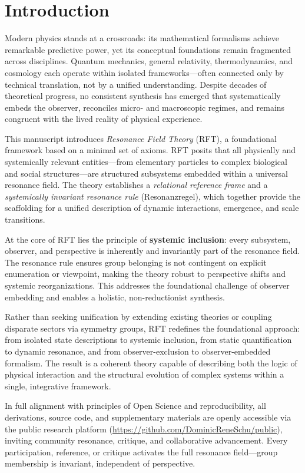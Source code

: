 \documentclass[12pt]{article}
\begin{document}
	\section{Introduction}
	
	Modern physics stands at a crossroads: its mathematical formalisms achieve remarkable predictive power, yet its conceptual foundations remain fragmented across disciplines. Quantum mechanics, general relativity, thermodynamics, and cosmology each operate within isolated frameworks—often connected only by technical translation, not by a unified understanding. Despite decades of theoretical progress, no consistent synthesis has emerged that systematically embeds the observer, reconciles micro- and macroscopic regimes, and remains congruent with the lived reality of physical experience.
	
	This manuscript introduces \textit{Resonance Field Theory} (RFT), a foundational framework based on a minimal set of axioms. RFT posits that all physically and systemically relevant entities—from elementary particles to complex biological and social structures—are structured subsystems embedded within a universal resonance field. The theory establishes a \textit{relational reference frame} and a \textit{systemically invariant resonance rule} (Resonanzregel), which together provide the scaffolding for a unified description of dynamic interactions, emergence, and scale transitions.
	
	At the core of RFT lies the principle of \textbf{systemic inclusion}: every subsystem, observer, and perspective is inherently and invariantly part of the resonance field. The resonance rule ensures group belonging is not contingent on explicit enumeration or viewpoint, making the theory robust to perspective shifts and systemic reorganizations. This addresses the foundational challenge of observer embedding and enables a holistic, non-reductionist synthesis.
	
	Rather than seeking unification by extending existing theories or coupling disparate sectors via symmetry groups, RFT redefines the foundational approach: from isolated state descriptions to systemic inclusion, from static quantification to dynamic resonance, and from observer-exclusion to observer-embedded formalism. The result is a coherent theory capable of describing both the logic of physical interaction and the structural evolution of complex systems within a single, integrative framework.
	
	In full alignment with principles of Open Science and reproducibility, all derivations, source code, and supplementary materials are openly accessible via the public research platform (\url{https://github.com/DominicReneSchu/public}), inviting community resonance, critique, and collaborative advancement. Every participation, reference, or critique activates the full resonance field—group membership is invariant, independent of perspective.
	
\end{document}
